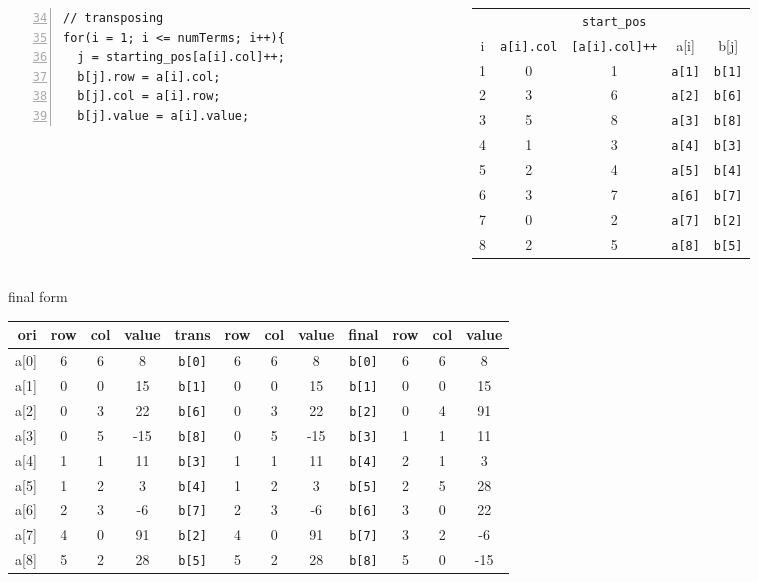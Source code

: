\documentclass[newPxFont,sthlmFooter,nooffset]{beamer}
\begin{document}
\begin{frame}
\begin{columns}
  \begin{column}{0.45\textwidth}
\begin{lstlisting}[frame=single, lineskip = -1pt, numbers = left, firstnumber=34, framexleftmargin=15pt, framexrightmargin=-5pt, xleftmargin = 25pt ]
// transposing
for(i = 1; i <= numTerms; i++){
  j = starting_pos[a[i].col]++;
  b[j].row = a[i].col;
  b[j].col = a[i].row;
  b[j].value = a[i].value;
\end{lstlisting}      
  \end{column}
  \begin{column}{0.55\textwidth}
    {\scriptsize
\begin{tabular} {c| c | c |  c | c }
  & & \texttt{start\_pos} & & \\
i & \texttt{a[i].col}& \texttt{[a[i].col]++} & a[i] & b[j] \\ \hline
1 & 0 & 1 & \texttt{a[1]} & \texttt{b[1]} \\
2 & 3 & 6 & \texttt{a[2]} & \texttt{b[6]} \\
3 & 5 & 8 & \texttt{a[3]} & \texttt{b[8]} \\
4 & 1 & 3 & \texttt{a[4]} & \texttt{b[3]} \\
5 & 2 & 4 & \texttt{a[5]} & \texttt{b[4]} \\
6 & 3 & 7 & \texttt{a[6]} & \texttt{b[7]} \\
7 & 0 & 2 & \texttt{a[7]} & \texttt{b[2]} \\
8 & 2 & 5 & \texttt{a[8]} & \texttt{b[5]} \\
\end{tabular}
    }    
  \end{column}
\end{columns}


\framebreak
final form 
{\scriptsize
\begin{tabular}{r |c c c || c | c c c || c | c c c}
  ori & row & col & value  & trans & row & col & value & final & row & col & value \\ \hline
  a[0]&	6	&	6	&	8	&	\texttt{b[0]}	&	6	&	6	&	8	&	\texttt{b[0]}	&	6	&	6	&	8	\\
  a[1]&	0	&	0	&	15	&	\texttt{b[1]}	&	0	&	0	&	15	&	\texttt{b[1]}	&	0	&	0	&	15	\\
  a[2]&	0	&	3	&	22	&	\texttt{b[6]}	&	0	&	3	&	22	&	\texttt{b[2]}	&	0	&	4	&	91	\\
  a[3]&	0	&	5	&	-15	&	\texttt{b[8]}	&	0	&	5	&	-15	&	\texttt{b[3]}	&	1	&	1	&	11	\\
  a[4]&	1	&	1	&	11	&	\texttt{b[3]}	&	1	&	1	&	11	&	\texttt{b[4]}	&	2	&	1	&	3	\\
  a[5]&	1	&	2	&	3	&	\texttt{b[4]}	&	1	&	2	&	3	&	\texttt{b[5]}	&	2	&	5	&	28	\\
  a[6]&	2	&	3	&	-6	&	\texttt{b[7]}	&	2	&	3	&	-6	&	\texttt{b[6]}	&	3	&	0	&	22	\\
  a[7]&	4	&	0	&	91	&	\texttt{b[2]}	&	4	&	0	&	91	&	\texttt{b[7]}	&	3	&	2	&	-6	\\
  a[8]&	5	&	2	&	28	&	\texttt{b[5]}	&	5	&	2	&	28	&	\texttt{b[8]}	&	5	&	0	&	-15	\\
\end{tabular}
}


\end{frame}
\end{document}
